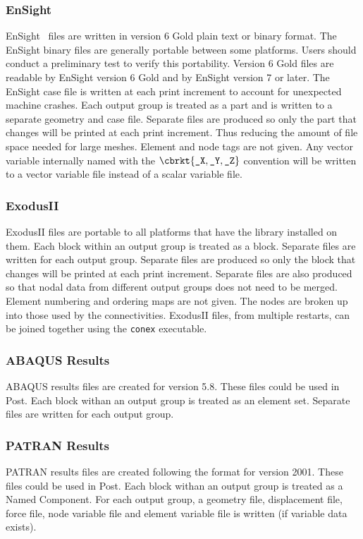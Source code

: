 \subsubsection{\textsf{EnSight}}
\textsf{EnSight}~\cite{EnSight6} 
files are written in version 6 Gold plain text or binary format. 
The \textsf{EnSight} binary files are generally portable between some platforms. 
Users should conduct a preliminary test to verify this portability. 
Version 6 Gold files are readable by \textsf{EnSight} 
version 6 Gold and by \textsf{EnSight}
version 7 or later.  The \textsf{EnSight} case file is written at each print
increment to account for unexpected machine crashes.  Each output group is
treated as a part and is written to a separate geometry and case file. 
Separate files are produced so only the part that changes will be printed
at each print increment.  Thus reducing the amount of file space needed for
large meshes.  Element and node tags are not given.  Any vector variable
internally named with the
$\cbrkt{\texttt{\_{X}}, \texttt{\_{Y}}, \texttt{\_{Z}}}$
convention will be written to a
vector variable file instead of a scalar variable file.

\subsubsection{\textsf{ExodusII}}
\textsf{ExodusII} files are portable to all platforms that have the library
installed on them.  Each block within an output group is treated as a block. 
Separate files are written for each output group. Separate files are produced 
so only the block that
changes will be printed at each print increment.  Separate files are also
produced so that nodal data from different output groups does not need to
be merged.  Element numbering and ordering maps are not given.  The nodes
are broken up into those used by the connectivities.  
\textsf{ExodusII} files, from
multiple restarts, can be joined together using the \texttt{conex} executable.

\subsubsection{\textsf{ABAQUS Results}}
\textsf{ABAQUS} results files are created for version 5.8. These files could 
be used in Post. Each block withan an output group is treated as an element 
set. Separate files are written for each output group. 

\subsubsection{\textsf{PATRAN Results}}
\textsf{PATRAN} results files are created following the format for version 2001. 
These files could be used in Post. Each block withan an output group is treated 
as a Named Component. For each output group, a geometry file, displacement file, 
force file, node variable file and element variable file is written (if variable 
data exists). 

